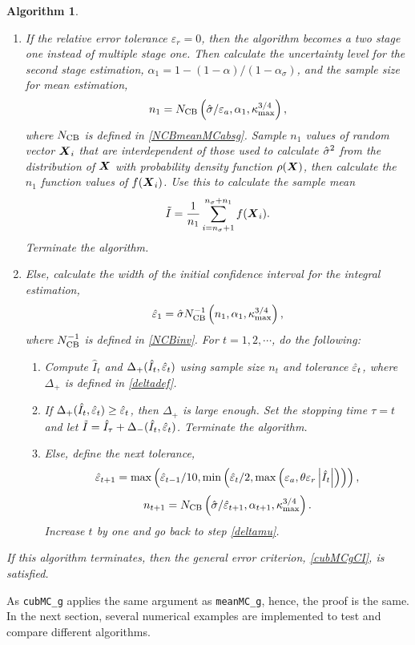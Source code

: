 \documentclass{iitthesis}
\newtheorem{algorithm}[theorem]{Algorithm}
\theoremstyle{definition}
\begin{document}
\begin{algorithm}
\begin{enumerate}
\item If the relative error tolerance $\varepsilon_r=0$, then the algorithm becomes a two stage one instead of multiple stage one. Then calculate the uncertainty level for the second stage estimation, $\alpha_1 = 1-(1-\alpha)/(1-\alpha_\sigma)$, and the sample size for mean estimation, $$n_1 = N_{\text{CB}}\left(\hat{\sigma}/\varepsilon_a,\alpha_1,\kappa_{\max}^{3/4}\right),$$where $N_{\text{CB}}$ is defined in \eqref{NCBmeanMCabsg}. Sample $n_1$ values of random vector $\boldsymbol{X}_i$ that are interdependent of those used to calculate $\hat{\sigma}^2$ from the distribution of $\boldsymbol{X}$ with probability density function $\rho(\boldsymbol{X})$, then calculate the $n_1$ function values of $f(\boldsymbol{X}_i)$. Use this to calculate the sample mean 
\begin{align}\label{hatIcubMCg}
\tilde{I}= \frac{1}{n_1}\sum_{i = n_\sigma+1}^{n_\sigma+n_1}f(\boldsymbol{X}_i).
\end{align}
Terminate the algorithm.
\item Else, calculate the width of the initial confidence interval for the integral estimation,
\begin{align}
\hat{\varepsilon}_1=\hat{\sigma} N_{\text{CB}}^{-1}\left(n_1,\alpha_1,\kappa_{\max}^{3/4}\right),
\end{align}
where $N_{\text{CB}}^{-1}$ is defined in \eqref{NCBinv}. For $t = 1,2,\cdots$, do the following:
\begin{enumerate}
\item  \label{deltamucubMCg}Compute $\hat{I}_t$ and $\Delta_{+}(\hat{I}_t,\hat{\varepsilon}_t)$ using sample size $n_t$ and tolerance $\hat{\varepsilon}_t$, where $\Delta_{+}$ is defined in \eqref{deltadef}.
\item If $\Delta_{+}(\hat{I}_t,\hat{\varepsilon}_t)\geq  \hat{\varepsilon}_t$, then $\Delta_{+}$ is large enough. Set the stopping time $\tau = t$ and let $\tilde{I} = \hat{I}_{\tau}+\Delta_{-}(\hat{I}_t,\hat{\varepsilon}_t)$. Terminate the algorithm.
\item Else, define the next tolerance, $$\hat{\varepsilon}_{t+1} = \max \left ( \hat{\varepsilon}_{t-1}/10,\min\left(\hat{\varepsilon}_t/2, \max\left(\varepsilon_a,\theta\varepsilon_r\left \lvert \hat{I}_t \right \rvert\right)\right)\right),$$ $$n_{t+1} = N_{\text{CB}}\left(\hat{\sigma}/\hat{\varepsilon}_{t+1},\alpha_{t+1},\kappa_{\max}^{3/4}\right).$$ Increase $t$ by one and go back to step \eqref{deltamu}. 
\end{enumerate}
\end{enumerate}
If this algorithm terminates, then the general error criterion, \eqref{cubMCgCI}, is satisfied.
\end{algorithm}
As {\tt cubMC\_g} applies the same argument as {\tt meanMC\_g}, hence, the proof is the same. In the next section, several numerical examples are implemented to test and compare different algorithms.
\end{document}
